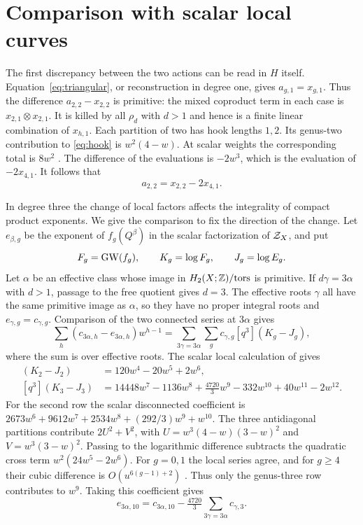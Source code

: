 \section{Comparison with scalar local curves}\label{sec:comparison}

The first discrepancy between the two actions can be read in
$H$ itself. Equation~\eqref{eq:triangular}, or reconstruction in
degree one, gives $a_{g,1}=x_{g,1}$. Thus the difference
$a_{2,2}-x_{2,2}$ is primitive: the mixed coproduct term in
each case is $x_{2,1}\otimes x_{2,1}$. It is killed by all
$\rho_d$ with $d>1$ and hence is a finite linear combination of
$x_{h,1}$. Each partition of two has hook lengths $1,2$. Its
genus-two contribution to \eqref{eq:hook} is $w^2(4-w)$.
At scalar weights the corresponding total is $8w^2$
\cite[\S8]{BP}. The difference of the evaluations is $-2w^3$,
which is the evaluation of $-2x_{4,1}$. It follows that
\begin{equation}\label{eq:two}
 a_{2,2}=x_{2,2}-2x_{4,1}.
\end{equation}

In degree three the change of local factors affects the integrality
of compact product exponents. We give the comparison to fix the
direction of the change. Let $e_{\beta,g}$ be the exponent of
$f_g(Q^\beta)$ in the scalar factorization of $\mathcal Z_X$, and put
\[
 F_g=\operatorname{GW}(f_g),\qquad K_g=\log F_g,\qquad J_g=\log E_g .
\]
Let $\alpha$ be an effective class whose image in
$H_2(X;\mathbb Z)/\mathrm{tors}$ is primitive. If $d\gamma=3\alpha$ with
$d>1$, passage to the free quotient gives $d=3$. The effective
roots $\gamma$ all have the same primitive image as $\alpha$, so
they have no proper integral roots and $e_{\gamma,g}=c_{\gamma,g}$.
Comparison of the two connected series at $3\alpha$ gives
\[
 \sum_h(c_{3\alpha,h}-e_{3\alpha,h})w^{h-1}
       =\sum_{3\gamma=3\alpha}\sum_g c_{\gamma,g}[q^3](K_g-J_g),
\]
where the sum is over effective roots.
The scalar local calculation of \cite[\S3]{Counterexample} gives
\begin{align*}
 [q^3](K_2-J_2)&=120w^4-20w^5+2w^6,\\
 [q^3](K_3-J_3)&=14448w^7-1136w^8+\tfrac{4720}{3}w^9
                       -332w^{10}+40w^{11}-2w^{12}.
\end{align*}
For the second row the scalar disconnected coefficient is
$2673w^6+9612w^7+2534w^8+(292/3)w^9+w^{10}$. The three
antidiagonal partitions contribute $2U^2+V^2$, with
$U=w^3(4-w)(3-w)^2$ and $V=w^3(3-w)^2$.
Passing to the logarithmic difference subtracts the quadratic
cross term $w^2(24w^5-2w^6)$. For $g=0,1$ the local series
agree, and for $g\ge4$ their cubic difference is
$O(u^{6(g-1)+2})$ \cite[\S2]{Counterexample}. Thus only the
genus-three row contributes to $w^9$. Taking this coefficient gives
\begin{equation}\label{eq:three}
 e_{3\alpha,10}=c_{3\alpha,10}
       -\tfrac{4720}{3}\sum_{3\gamma=3\alpha}c_{\gamma,3}.
\end{equation}

